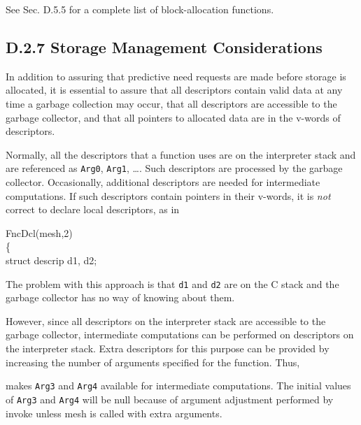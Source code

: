 \noindent
See Sec. D.5.5 for a complete list of block-allocation functions.

\subsection[D.2.7 Storage Management Considerations]%
           {D.2.7 Storage Management Considerations}

In addition to assuring that predictive need requests are made before
storage is allocated, it is essential to assure that all descriptors
contain valid data at any time a garbage collection may occur, that
all descriptors are accessible to the garbage collector, and that all
pointers to allocated data are in the v-words of descriptors.

Normally, all the descriptors that a function uses are on the interpreter
stack and are referenced as \texttt{Arg0}, \texttt{Arg1}, \ldots.  Such
descriptors are processed by the garbage collector. Occasionally,
additional descriptors are needed for intermediate computations. If such
descriptors contain pointers in their v-words, it is \textit{not} correct
to declare local descriptors, as in
\goodbreak
\begin{iconcode}
\color{red}FncDcl(mesh,2)\\
\{\\
\>struct descrip d1, d2;
\end{iconcode}

\noindent
The problem with this approach is that \texttt{d1} and \texttt{d2} are on
the C stack and the garbage collector has no way of knowing about them.

However, since all descriptors on the interpreter stack are accessible
to the garbage collector, intermediate computations can be performed
on descriptors on the interpreter stack. Extra descriptors for this
purpose can be provided by increasing the number of arguments
specified for the function. Thus,


\noindent
makes \texttt{Arg3} and \texttt{Arg4} available for intermediate
computations. The initial values of \texttt{Arg3} and \texttt{Arg4} will be
null because of argument adjustment performed by invoke unless mesh is
called with extra arguments.

